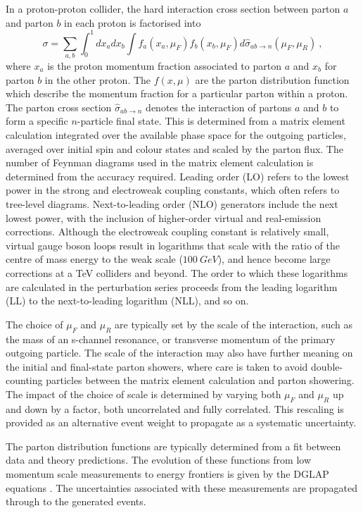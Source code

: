 In a proton-proton collider, the hard interaction cross section between parton $a$ and parton $b$ in each proton is factorised into \cite{Ellis:1991qj}
%
\begin{equation}
    \sigma = \sum_{a,b} \int_0^1 dx_a dx_b \int f_a(x_a,\mu_F)f_b(x_b,\mu_F) d\hat{\sigma}_{ab\rightarrow n}(\mu_F,\mu_R)\ ,
\end{equation}
%
where $x_a$ is the proton momentum fraction associated to parton $a$ and $x_b$ for parton $b$ in the other proton. The $f(x,\mu)$ are the parton distribution function which describe the momentum fraction for a particular parton within a proton. The parton cross section $\hat{\sigma}_{ab\rightarrow n}$ denotes the interaction of partons $a$ and $b$ to form a specific $n$-particle final state. This is determined from a matrix element calculation integrated over the available phase space for the outgoing particles, averaged over initial spin and colour states and scaled by the parton flux. The number of Feynman diagrams used in the matrix element calculation is determined from the accuracy required. Leading order (LO) refers to the lowest power in the strong and electroweak coupling constants, which often refers to tree-level diagrams. Next-to-leading order (NLO) generators include the next lowest power, with the inclusion of higher-order virtual and real-emission corrections. Although the electroweak coupling constant is relatively small, virtual gauge boson loops result in logarithms \cite{Sudakov:1954sw} that scale with the ratio of the centre of mass energy to the weak scale ($\SI{100}{GeV}$), and hence become large corrections at a TeV colliders and beyond. The order to which these logarithms are calculated in the perturbation series proceeds from the leading logarithm (LL) to the next-to-leading logarithm (NLL), and so on.

The choice of $\mu_F$ and $\mu_R$ are typically set by the scale of the interaction, such as the mass of an s-channel resonance, or transverse momentum of the primary outgoing particle. The scale of the interaction may also have further meaning on the initial and final-state parton showers, where care is taken to avoid double-counting particles between the matrix element calculation and parton showering. The impact of the choice of scale is determined by varying both $\mu_F$ and $\mu_R$ up and down by a factor, both uncorrelated and fully correlated. This rescaling is provided as an alternative event weight to propagate as a systematic uncertainty.

The parton distribution functions are typically determined from a fit between data and theory predictions. The evolution of these functions from low momentum scale measurements to energy frontiers is given by the DGLAP equations \cite{Altarelli:1977zs,Dokshitzer:1977sg,Gribov:1972ri}. The uncertainties associated with these measurements are propagated through to the generated events.

